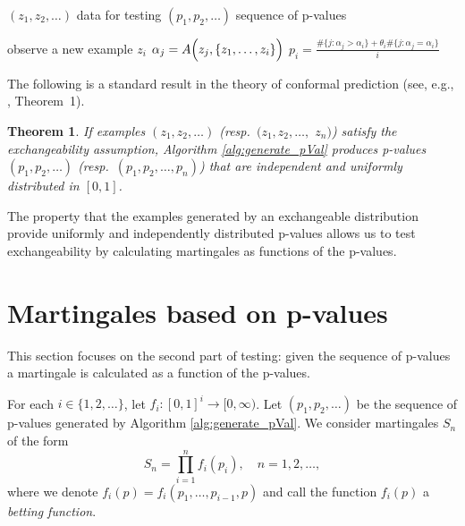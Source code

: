 \documentclass{article}
\newtheorem{theorem}{Theorem}
\theoremstyle{definition}
\begin{document}
\begin{algorithm}[tb]
\caption{Generating p-values on-line}
\label{alg:generate_pVal}
\begin{algorithmic}
    $(z_1, z_2,\ldots)$ data for testing
    $(p_1, p_2,\ldots)$ sequence of p-values

   \STATE observe a new example $z_i$
   \STATE $\alpha_j = A\Bigl(z_j,\{z_1,\ldots,z_i\}\Bigr)$
   \ENDFOR
   \STATE  $p_i = \frac{\#\{j: \alpha_j > \alpha_i \} + \theta_i \#\{j: \alpha_j = \alpha_i \}}{i}$
   \ENDFOR
\end{algorithmic}
\end{algorithm}

The following is a standard result in the theory of conformal prediction
(see, e.g., \citealt{vovk/nouretdinov/gammerman:2003}, Theorem~1).
\begin{theorem} %
If examples $(z_1, z_2,\ldots)$
(resp.\ $(z_1, z_2,\ldots,$ $z_n)$)
satisfy the exchangeability assumption,
Algorithm \ref{alg:generate_pVal} produces p-values
$(p_1, p_2,\ldots)$ (resp.\ $(p_1, p_2,\ldots, p_n)$)
that are independent and uniformly distributed in $[0,1]$.
\end{theorem}
The property that the examples generated by an exchangeable distribution
provide uniformly and independently
distributed p-values allows us to test exchangeability
by calculating martingales as functions of the p-values.

\section{Martingales based on p-values} \label{sec:construction}

This section focuses on the second part of testing:
given the sequence of p-values a martingale is
calculated as a function of the p-values.

For each $i\in\{1,2,\ldots\}$, let $f_i:[0,1]^i\to[0,\infty)$.
Let $(p_1,p_2,\ldots)$ be the sequence of p-values generated by Algorithm \ref{alg:generate_pVal}.
We consider martingales $S_n$ of the form
\begin{equation}\label{eq:mart}
  S_n = \prod_{i=1}^n f_i(p_i),
  \quad
  n=1,2,\ldots,
\end{equation}
where we denote $f_i(p) = f_i(p_1,\ldots,p_{i-1}, p)$
and call the function $f_i(p)$ a \emph{betting function}.
\end{document}
